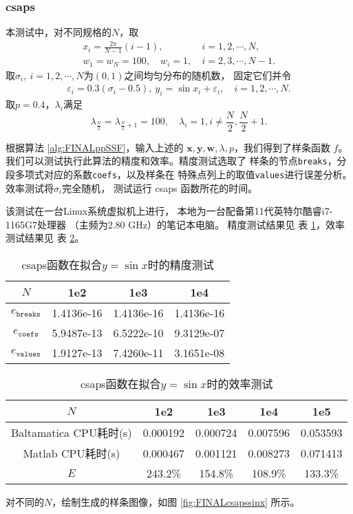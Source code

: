 \subsubsection{csaps}
\label{subsubsec:csapssinx}
本测试中，对不同规格的$N$，取
\begin{align*}
  x_{i}=\frac{2\pi}{N-1} (i-1),
  \quad &i=1,2,\cdots,N,\\
  w_{1}=w_{N}=100,\quad w_{i}=1, \ &i=2,3,\cdots,N-1.
\end{align*}
取$\sigma_{i},\ i=1,2,\cdots,N$为$(0,1)$之间均匀分布的随机数，
固定它们并令
\begin{align*}
  \varepsilon_{i}=0.3(\sigma_{i}-0.5),\
  y_{i}=\sin x_{i}+\varepsilon_{i},\quad i=1,2,\cdots,N.
\end{align*}
取$p=0.4$，$\lambda_{i}$满足
\begin{displaymath}
  \lambda_{\frac{N}{2}}=\lambda_{\frac{N}{2}+1}=100,\quad
  \lambda_{i}=1, i\neq \frac{N}{2},\frac{N}{2}+1.
\end{displaymath}

根据算法 \ref{alg:FINALppSSF}，输入上述的
$\mathbf{x}, \mathbf{y}, \mathbf{w}, \lambda, p$，我们得到了样条函数
$f$。我们可以测试执行此算法的精度和效率。精度测试选取了
样条的节点\texttt{breaks}，分段多项式对应的系数\texttt{coefs}，以及样条在
特殊点列上的取值\texttt{values}进行误差分析。效率测试将$\sigma_{i}$完全随机，
测试运行 csaps 函数所花的时间。

该测试在一台Linux系统虚拟机上进行，
本地为一台配备第11代英特尔酷睿i7-1165G7处理器
（主频为2.80 GHz）的笔记本电脑。
精度测试结果见
表 \ref{tab:FINALcsapssinxacc}，效率测试结果见
表 \ref{tab:FINALcsapssinxtime}。

\begin{table}[htbp]
  \centering
  \caption{\label{tab:FINALcsapssinxacc}csaps函数在拟合$y=\sin x$时的精度测试}
  \begin{tabular}{cccc}
    \hline
    $N$& 1e2 & 1e3 & 1e4\\
    \hline
    $e_{\texttt{breaks}}$& 1.4136e-16& 1.4136e-16& 1.4136e-16\\
    $e_{\texttt{coefs}}$&5.9487e-13&6.5222e-10&9.3129e-07\\
    $e_{\texttt{values}}$& 1.9127e-13&7.4260e-11&3.1651e-08\\
    \hline
  \end{tabular}
\end{table}

\begin{table}[htbp]
  \centering
  \caption{\label{tab:FINALcsapssinxtime}csaps函数在拟合$y=\sin x$时的效率测试}
  \begin{tabular}{ccccc}
    \hline
    $N$&1e2&1e3&1e4&1e5\\
    \hline
    Baltamatica CPU耗时(s)&0.000192&0.000724&0.007596&0.053593\\
    Matlab CPU耗时(s)&0.000467&0.001121&0.008273&0.071413\\
    $E$&243.2\%&154.8\%&108.9\%&133.3\%\\
    \hline
  \end{tabular}
\end{table}
对不同的$N$，绘制生成的样条图像，如图 \ref{fig:FINALcsapssinx} 所示。

